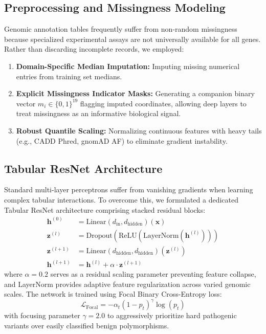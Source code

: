 \documentclass[conference]{IEEEtran}
\begin{document}
\subsection{Preprocessing and Missingness Modeling}
Genomic annotation tables frequently suffer from non-random missingness because specialized experimental assays are not universally available for all genes. Rather than discarding incomplete records, we employed:
\begin{enumerate}
    \item \textbf{Domain-Specific Median Imputation:} Imputing missing numerical entries from training set medians.
    \item \textbf{Explicit Missingness Indicator Masks:} Generating a companion binary vector $m_i \in \{0, 1\}^{19}$ flagging imputed coordinates, allowing deep layers to treat missingness as an informative biological signal.
    \item \textbf{Robust Quantile Scaling:} Normalizing continuous features with heavy tails (e.g., CADD Phred, gnomAD AF) to eliminate gradient instability.
\end{enumerate}

\subsection{Tabular ResNet Architecture}
Standard multi-layer perceptrons suffer from vanishing gradients when learning complex tabular interactions. To overcome this, we formulated a dedicated Tabular ResNet architecture comprising stacked residual blocks:
\begin{align}
    \mathbf{h}^{(0)} &= \text{Linear}(d_{\text{in}}, d_{\text{hidden}})(\mathbf{x}) \\
    \mathbf{z}^{(l)} &= \text{Dropout}(\text{ReLU}(\text{LayerNorm}(\mathbf{h}^{(l)}))) \\
    \mathbf{z}^{(l+1)} &= \text{Linear}(d_{\text{hidden}}, d_{\text{hidden}})(\mathbf{z}^{(l)}) \\
    \mathbf{h}^{(l+1)} &= \mathbf{h}^{(l)} + \alpha \cdot \mathbf{z}^{(l+1)}
\end{align}
where $\alpha = 0.2$ serves as a residual scaling parameter preventing feature collapse, and LayerNorm provides adaptive feature regularization across varied genomic scales. The network is trained using Focal Binary Cross-Entropy loss:
\begin{equation}
    \mathcal{L}_{\text{Focal}} = -\alpha_t (1 - p_t)^\gamma \log(p_t)
\end{equation}
with focusing parameter $\gamma = 2.0$ to aggressively prioritize hard pathogenic variants over easily classified benign polymorphisms.
\end{document}
